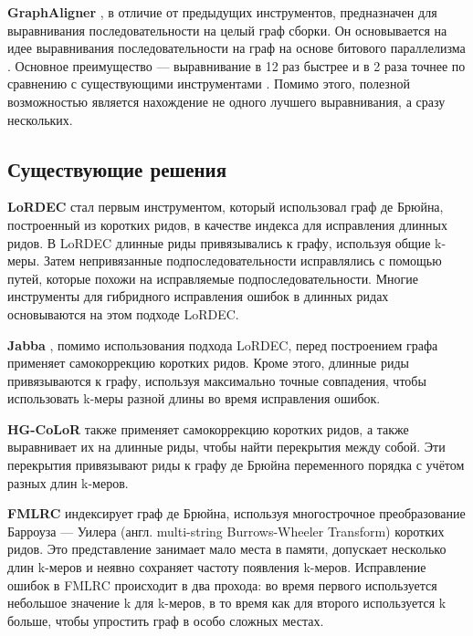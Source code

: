 \documentclass[14pt]{matmex-diploma-custom}
\begin{document}
\textbf{GraphAligner} \cite{art:rautiainen2020graphaligner}, в отличие от предыдущих инструментов, предназначен для выравнивания последовательности на целый граф сборки. Он основывается на идее выравнивания последовательности на граф на основе битового параллелизма \cite{art:bpstga}. Основное преимущество --- выравнивание в 12 раз быстрее и в 2 раза точнее по сравнению с существующими инструментами \cite{art:rautiainen2020graphaligner}. Помимо этого, полезной возможностью является нахождение не одного лучшего выравнивания, а сразу нескольких.


\subsection{Существующие решения}
\textbf{LoRDEC} \cite{art:salmela2014lordec} стал первым инструментом, который использовал граф де Брюйна, построенный из коротких ридов, в качестве индекса для исправления длинных ридов. В LoRDEC длинные риды привязывались к графу, используя общие k-меры. Затем непривязанные подпоследовательности исправлялись с помощью путей, которые похожи на исправляемые подпоследовательности. Многие инструменты для гибридного исправления ошибок в длинных ридах основываются на этом подходе LoRDEC.

\textbf{Jabba} \cite{art:miclotte2016jabba}, помимо использования подхода LoRDEC, перед построением графа применяет самокоррекцию коротких ридов. Кроме этого, длинные риды привязываются к графу, используя максимально точные совпадения, чтобы использовать k-меры разной длины во время исправления ошибок.

\textbf{HG-CoLoR} \cite{art:morisse2018hybrid} также применяет самокоррекцию коротких ридов, а также выравнивает их на длинные риды, чтобы найти перекрытия между собой. Эти перекрытия привязывают риды к графу де Брюйна переменного порядка с учётом разных длин k-меров.

\textbf{FMLRC} \cite{art:wang2018fmlrc} индексирует граф де Брюйна, используя многострочное преобразование Барроуза — Уилера (англ. multi-string Burrows-Wheeler Transform) коротких ридов. Это представление занимает мало места в памяти, допускает несколько длин k-меров и неявно сохраняет частоту появления k-меров. Исправление ошибок в FMLRC происходит в два прохода: во время первого используется небольшое значение k для k-меров, в то время как для второго используется k больше, чтобы упростить граф в особо сложных местах.
\end{document}
